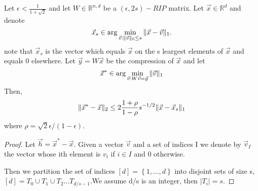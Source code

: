 \begin{theorem}
    Let $ \epsilon < \frac{1}{1 + \sqrt 2}  $ and let $ W \in \mathbb{R}^{n, d} $ be a $ (\epsilon, 2s)-RIP $ matrix. Let $ \vec{x} \in \mathbb{R}^d $ and denote
    \[
        \vec{x}_s \in \arg\min_{\vec{v}: \Arrowvert \vec{v} \Arrowvert_0 \le s} \Arrowvert \vec{x} - \vec{v} \Arrowvert_1.
    \]
    note that $ \vec{x}_s $ is the vector which equals $ \vec{x} $ on the s leargest elements of $ \vec{x} $ and equals 0 elsewhere. Let $ \vec{y} = W \vec{x} $ be the compression of $ \vec{x} $ and let
    \[
        \vec{x}^* \in \arg\min_{\vec{v}: W \vec{v} = \vec{y}} \Arrowvert \vec{v} \Arrowvert_1
    \]
    Then,
    \[
        \Arrowvert \vec{x}^* - \vec{x} \Arrowvert_2 \le 2 \frac{1+\rho}{1-\rho} s^{-1/2} \Arrowvert \vec{x} - \vec{x}_s \Arrowvert_1
    \]
    where $ \rho = \sqrt 2 \epsilon / (1 - \epsilon) $.
    \begin{proof}
        Let $ \vec{h} = \vec{x}^* - \vec{x} $. Given a vector $ \vec{v} $ and a set of indices I we denote by $ \vec{v}_I $ the vector whose ith element is $ v_i $ if $ i \in I $ and 0 otherwise.
        
        Then we partition the set of indices $ [d] = \left\{ 1, \ldots, d \right\} $ into disjoint sets of size s, $ [d] = T_0 \cup T_1 \cup T_2 \ldots T_{d/s-1} $.We assume d/s is an integer, then $ \left| T_i \right| = s $.


\end{proof}
\end{theorem}

